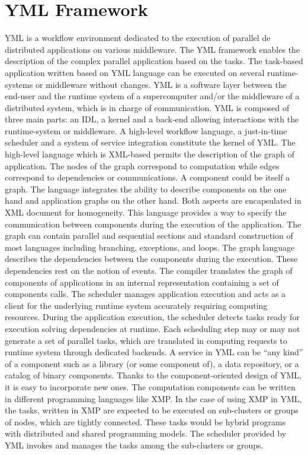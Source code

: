 \section{YML Framework}
YML is a workflow environment dedicated to the execution of parallel de distributed applications on various middleware. The YML framework enables the description of the complex parallel application based on the tasks. The task-based application written based on YML language can be executed on several runtime-systems or middleware without changes. YML is a software layer between the end-user and the runtime system of a supercomputer and/or the middleware of a distributed system, which is in charge of communication. YML is composed of three main parts: an IDL, a kernel and a back-end allowing interactions with the runtime-system or middleware. A high-level workflow language, a just-in-time scheduler and a system of service integration constitute the kernel of YML. The high-level language which is XML-based permits the description of the graph of application. The nodes of the graph correspond to computation while edges correspond to dependencies or communications. A component could be itself a graph. The language integrates the ability to describe components on the one hand and application graphs on the other hand. Both aspects are encapsulated in XML document for homogeneity. This language provides a way to specify the communication between components during the execution of the application. The graph can contain parallel and sequential sections and standard construction of most languages including branching, exceptions, and loops. The graph language describes the dependencies between the components during the execution. These dependencies rest on the notion of events. The compiler translates the graph of components of applications in an internal representation containing a set of components calls. The scheduler manages application execution and acts as a client for the underlying runtime system accurately requiring computing resources. During the application execution, the scheduler detects tasks ready for execution solving dependencies at runtime. Each scheduling step may or may not generate a set of parallel tasks, which are translated in computing requests to runtime system through dedicated backends. A service in YML can be “any kind” of a component such as a library (or some component of), a data repository, or a catalog of binary components. Thanks to the component-oriented design of YML, it is easy to incorporate new ones. The computation components can be written in different programming languages like XMP. In the case of using XMP in YML, the tasks, written in XMP are expected to be executed on sub-clusters or groups of nodes, which are tightly connected. These tasks would be hybrid programs with distributed and shared programming models. The scheduler provided by YML invokes and manages the tasks among the sub-clusters or
groups.

